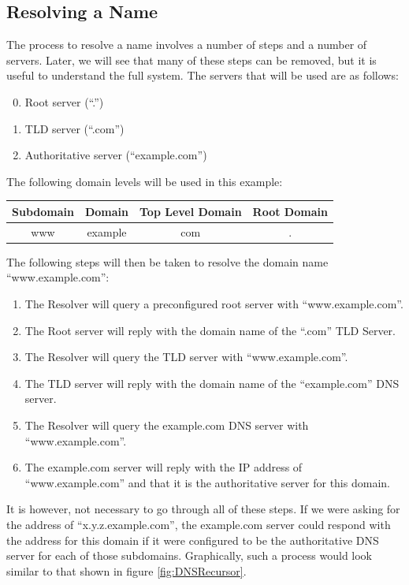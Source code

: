 		\subsection{Resolving a Name}
			The process to resolve a name involves a number of steps and a number of servers.
			Later, we will see that many of these steps can be removed, but it is useful to understand the full system.
			The servers that will be used are as follows:
			\begin{enumerate}
				\setcounter{enumi}{-1}
				\item Root server (``.'')
				\item TLD server (``.com'')
				\item Authoritative server (``example.com'')
			\end{enumerate}
			The following domain levels will be used in this example:
			\begin{center}
				\begin{tabular}{c c c c }
					\toprule
					\textbf{Subdomain} & \textbf{Domain} & \textbf{Top Level Domain} & \textbf{Root Domain} \\
					\toprule
					www & example & com & . \\
					\bottomrule
				\end{tabular}
			\end{center}
			The following steps will then be taken to resolve the domain name ``www.example.com'':
			\begin{enumerate}
				\item The Resolver will query a preconfigured root server with ``www.example.com''.
				\item The Root server will reply with the domain name of the ``.com'' TLD Server.
				\item The Resolver will query the TLD server with ``www.example.com''.
				\item The TLD server will reply with the domain name of the ``example.com'' DNS server.
				\item The Resolver will query the example.com DNS server with ``www.example.com''.
				\item The example.com server will reply with the IP address of ``www.example.com'' and that it is the authoritative server for this domain.
			\end{enumerate}
			It is however, not necessary to go through all of these steps.
			If we were asking for the address of ``x.y.z.example.com'', the example.com server could respond with the address for this domain if it were configured to be the authoritative DNS server for each of those subdomains.
			Graphically, such a process would look similar to that shown in figure \ref{fig:DNSRecursor}.

